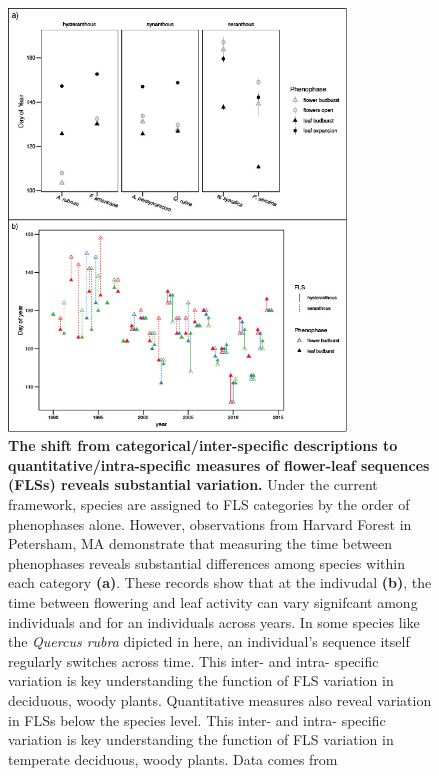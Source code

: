 \documentclass[11pt]{article}
\begin{document}
{ \begin{figure}[h!]
        \centering
         \includegraphics[width=0.8\textwidth]{..//..//intraspecificplots.jpg}
          \caption{\textbf{The shift from categorical/inter-specific descriptions to quantitative/intra-specific measures of flower-leaf sequences (FLSs) reveals substantial variation.} Under the current framework, species are assigned to FLS categories by the order of phenophases alone. However, observations from Harvard Forest in Petersham, MA demonstrate that measuring the time between phenophases reveals substantial differences among species within each category \textbf{(a)}. These records show that at the indivudal \textbf{(b)}, the time between flowering and leaf activity can vary signifcant among individuals and for an individuals across years. In some species like the \emph{Quercus rubra} dipicted in here, an individual's sequence itself regularly switches across time. This inter- and intra- specific variation is key understanding the function of FLS variation in deciduous, woody plants. Quantitative measures also reveal variation in FLSs below the species level. This inter- and intra- specific variation is key understanding the function of FLS variation in temperate deciduous, woody plants. Data comes from \citet{OKeefe2015}}
        \label{fig:vizzy}
    \end{figure}

}
\end{document}
